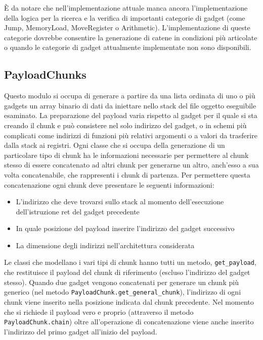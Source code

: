 È da notare che nell'implementazione attuale manca ancora
l'implementazione della logica per la ricerca e la verifica di
importanti categorie di gadget (come Jump, MemoryLoad, MoveRegister o
Arithmetic). L'implementazione di queste categorie dovrebbe consentire
la generazione di catene in condizioni più articolate o quando le
categorie di gadget attualmente implementate non sono disponibili.

\subsection{PayloadChunks}

Questo modulo si occupa di generare a partire da una lista ordinata di
uno o più gadgets un array binario di dati da iniettare nello stack
del file oggetto eseguibile esaminato. La preparazione del payload
varia rispetto al gadget per il quale si sta creando il chunk e può
consistere nel solo indirizzo del gadget, o in schemi più complicati
come indirizzi di funzioni più relativi argomenti o a valori da
trasferire dalla stack ai registri. Ogni classe che si occupa della
generazione di un particolare tipo di chunk ha le informazioni
necessarie per permettere al chunk stesso di essere concatenato ad
altri chunk per generarne un altro, anch'esso a sua volta
concatenabile, che rappresenti i chunk di partenza. Per permettere
questa concatenazione ogni chunk deve presentare le seguenti
informazioni:


\begin{itemize}

\item L'indirizzo che deve trovarsi sullo stack al momento
  dell'esecuzione dell'istruzione ret del gadget precedente 

\item In quale posizione del payload inserire l'indirizzo del gadget
  successivo

\item La dimensione degli indirizzi nell'architettura considerata

\end{itemize}


Le classi che modellano i vari tipi di chunk hanno tutti un metodo,
\lstinline{get_payload}, che restituisce il payload del chunk di
riferimento (escluso l'indirizzo del gadget stesso). Quando due gadget
vengono concatenati per generare un chunk più generico (nel metodo
\lstinline{PayloadChunk.get_general_chunk}), l'indirizzo di ogni chunk
viene inserito nella posizione indicata dal chunk precedente. Nel
momento che si richiede il payload vero e proprio (attraverso il
metodo \lstinline{PayloadChunk.chain}) oltre all'operazione di
concatenazione viene anche inserito l'indirizzo del primo gadget
all'inizio del payload.

